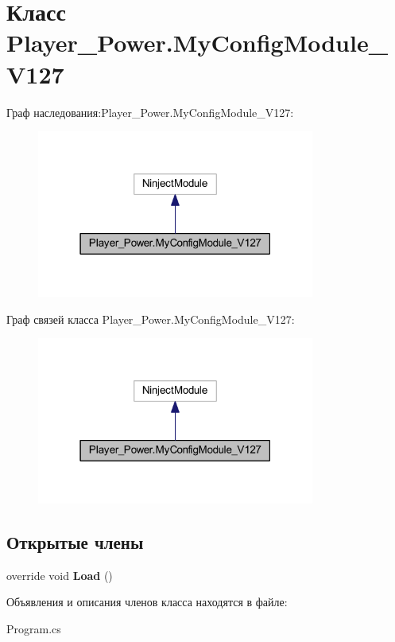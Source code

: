 \section{Класс Player\-\_\-\-Power.\-My\-Config\-Module\-\_\-\-V127}
\label{class_player___power_1_1_my_config_module___v127}


Граф наследования\-:Player\-\_\-\-Power.\-My\-Config\-Module\-\_\-\-V127\-:
\nopagebreak
\begin{figure}[H]
\begin{center}
\leavevmode
\includegraphics[width=259pt]{class_player___power_1_1_my_config_module___v127__inherit__graph}
\end{center}
\end{figure}


Граф связей класса Player\-\_\-\-Power.\-My\-Config\-Module\-\_\-\-V127\-:
\nopagebreak
\begin{figure}[H]
\begin{center}
\leavevmode
\includegraphics[width=259pt]{class_player___power_1_1_my_config_module___v127__coll__graph}
\end{center}
\end{figure}
\subsection*{Открытые члены}
\begin{DoxyCompactItemize}
\item 
override void {\bfseries Load} ()\label{class_player___power_1_1_my_config_module___v127_a9cbed41a11edf4706a45f381ef91b7ee}

\end{DoxyCompactItemize}


Объявления и описания членов класса находятся в файле\-:\begin{DoxyCompactItemize}
\item 
Program.\-cs\end{DoxyCompactItemize}
